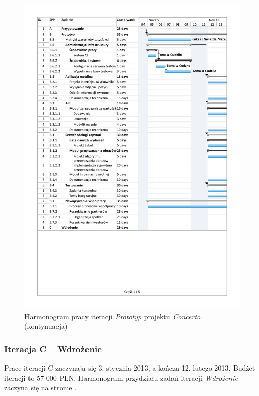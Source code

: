 \begin{figure}[p]
    \ContinuedFloat
    \includegraphics[trim=1.2cm 1.2cm 1.2cm 1.2cm, page=5, width=\textwidth]{./figury/harmonogram/harmonogram-pracy-B-prototyp}
    \caption[]{Harmonogram pracy iteracji \emph{Prototyp} projektu \emph{Concerto}. (kontynuacja)}
\end{figure}

\subsubsection{Iteracja C -- Wdrożenie}
Prace iteracji C zaczynają się 3. stycznia 2013, a kończą 12. lutego 2013.
Budżet iteracji to 57 000 PLN. Harmonogram przydziału zadań iteracji
\emph{Wdrożenie} zaczyna się na stronie
\pageref{fig:harmonogram:iteracja_wdrozenie}.

